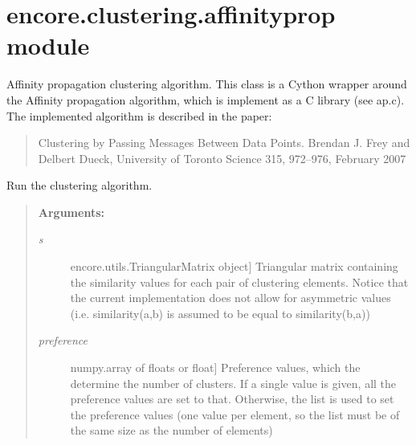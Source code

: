 \documentclass[letterpaper,10pt,english]{sphinxmanual}
\begin{document}
\section{encore.clustering.affinityprop module}
\label{index:encore-clustering-affinityprop-module}\label{index:module-encore.clustering.affinityprop}

\begin{fulllineitems}
\label{index:encore.clustering.affinityprop.AffinityPropagation}
Affinity propagation clustering algorithm. This class is a Cython wrapper around the Affinity propagation algorithm, which is implement as a C library (see ap.c). The implemented algorithm is described in the paper:
\begin{quote}

Clustering by Passing Messages Between Data Points.
Brendan J. Frey and Delbert Dueck, University of Toronto
Science 315, 972–976, February 2007
\end{quote}

\begin{fulllineitems}
\label{index:encore.clustering.affinityprop.AffinityPropagation.run}
\end{fulllineitems}


Run the clustering algorithm.
\begin{quote}

\textbf{Arguments:}
\begin{description}
\item[{\emph{s}}] \leavevmode{[}encore.utils.TriangularMatrix object{]}
Triangular matrix containing the similarity values for each pair of clustering elements. Notice that the current implementation does not allow for asymmetric values (i.e. similarity(a,b) is assumed to be equal to similarity(b,a))

\item[{\emph{preference}}] \leavevmode{[}numpy.array of floats or float{]}
Preference values, which the determine the number of clusters. If a single value is given, all the preference values are set to that. Otherwise, the list is used to set the preference values (one value per element, so the list must be of the same size as the number of elements)


\end{description}
\end{quote}
\end{fulllineitems}
\end{document}
